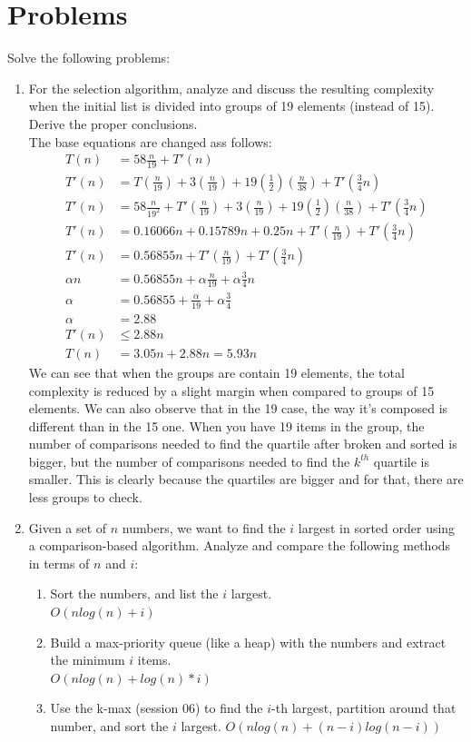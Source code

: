 \documentclass{article}
\begin{document}
\section{Problems}
Solve the following problems:
\begin{enumerate}
    \item For the selection algorithm, analyze and discuss the resulting complexity when the initial list is divided into groups of 19 elements (instead of 15). Derive the proper conclusions.\\
    The base equations are changed ass follows:
    \begin{align*}
        T(n) &= 58\frac{n}{19} + T'(n)\\
        T'(n) &= T(\frac{n}{19}) + 3(\frac{n}{19}) + 19(\frac{1}{2})(\frac{n}{38}) + T'(\frac{3}{4}n)\\
        T'(n) &= 58\frac{n}{19^2} + T'(\frac{n}{19}) + 3(\frac{n}{19}) + 19(\frac{1}{2})(\frac{n}{38}) + T'(\frac{3}{4}n)\\
        T'(n) &= 0.16066n +0.15789n + 0.25n + T'(\frac{n}{19}) + T'(\frac{3}{4}n)\\
        T'(n) &= 0.56855n + T'(\frac{n}{19}) + T'(\frac{3}{4}n)\\
        \alpha n &=0.56855n + \alpha \frac{n}{19} + \alpha \frac{3}{4}n\\
        \alpha &=0.56855 + \frac{\alpha}{19} + \alpha \frac{3}{4}\\
        \alpha &= 2.88\\
        T'(n) &\leq 2.88n\\
        T(n) &= 3.05n + 2.88n = 5.93n
    \end{align*}
    We can see that when the groups are contain 19 elements, the total complexity is reduced by a slight margin when compared to groups of 15 elements. We can also observe that in the 19 case, the way it's composed is different than in the 15 one. When you have 19 items in the group, the number of comparisons needed to find the quartile after broken and sorted is bigger, but the number of comparisons needed to find the $k^{th}$ quartile is smaller. This is clearly because the quartiles are bigger and for that, there are less groups to check.

    \item Given  a  set  of $n$ numbers,  we  want  to  find  the $i$ largest  in  sorted  order  using  a  comparison-based algorithm. Analyze and compare the following methods in terms of $n$ and $i$:
    \begin{enumerate}
        \item Sort the numbers, and list the $i$ largest.\\
        $O(nlog(n) + i )$
        \item Build a max-priority queue (like a heap) with the numbers and extract the minimum $i$ items.\\
        $O(nlog(n) + log(n) * i)$
        \item Use the k-max (session 06) to find the $i$-th largest, partition around that number, and sort the $i$ largest.
        $O(nlog(n) + (n-i)log(n - i))$
    \end{enumerate}


\end{enumerate}
\end{document}
